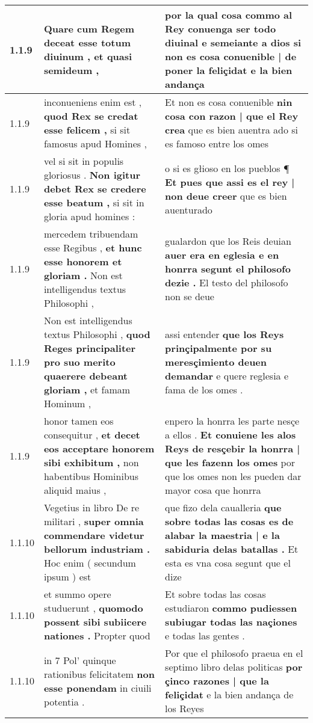 \begin{tabular}{|p{1cm}|p{6.5cm}|p{6.5cm}|}
1.1.9 & Quare cum Regem deceat \textbf{ esse totum diuinum , } et quasi semideum , & por la qual cosa commo al Rey conuenga ser todo diuinal e semeiante a dios \textbf{ si non es cosa conuenible | de poner la feliçidat } e la bien andança \\\hline
1.1.9 & inconueniens enim est , \textbf{ quod Rex se credat esse felicem , } si sit famosus apud Homines , & Et non es cosa conuenible \textbf{ nin cosa con razon | que el Rey crea } que es bien auentra ado si es famoso entre los omes \\\hline
1.1.9 & vel si sit in populis gloriosus . \textbf{ Non igitur debet Rex se credere esse beatum , } si sit in gloria apud homines : & o si es głioso en los pueblos ¶ \textbf{ Et pues que assi es el rey | non deue creer } que es bien auenturado \\\hline
1.1.9 & mercedem tribuendam esse Regibus , \textbf{ et hunc esse honorem et gloriam . } Non est intelligendus textus Philosophi , & gualardon que los Reis deuian \textbf{ auer era en eglesia e en honrra segunt el philosofo dezie . } El testo del philosofo non se deue \\\hline
1.1.9 & Non est intelligendus textus Philosophi , \textbf{ quod Reges principaliter pro suo merito quaerere debeant gloriam , } et famam Hominum , & assi entender \textbf{ que los Reys prinçipalmente por su meresçimiento deuen demandar } e quere reglesia e fama de los omes . \\\hline
1.1.9 & honor tamen eos consequitur , \textbf{ et decet eos acceptare honorem sibi exhibitum , } non habentibus Hominibus aliquid maius , & enpero la honrra les parte nesçe a ellos . \textbf{ Et conuiene les alos Reys de resçebir la honrra | que les fazenn los omes } por que los omes non les pueden dar mayor cosa que honrra \\\hline
1.1.10 & Vegetius in libro De re militari , \textbf{ super omnia commendare videtur bellorum industriam . } Hoc enim ( secundum ipsum ) est & que fizo dela caualleria \textbf{ que sobre todas las cosas es de alabar la maestria | e la sabiduria delas batallas . } Et esta es vna cosa segunt que el dize \\\hline
1.1.10 & et summo opere studuerunt , \textbf{ quomodo possent sibi subiicere nationes . } Propter quod & Et sobre todas las cosas estudiaron \textbf{ commo pudiessen subiugar todas las naçiones } e todas las gentes . \\\hline
1.1.10 & in 7 Pol’ quinque rationibus felicitatem \textbf{ non esse ponendam } in ciuili potentia . & Por que el philosofo praeua en el septimo libro delas politicas \textbf{ por çinco razones | que la feliçidat } e la bien andança de los Reyes \\\hline

\end{tabular}
